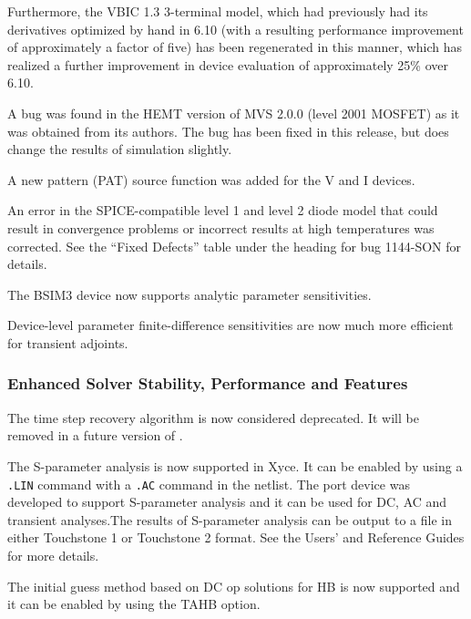 \documentclass[letterpaper]{scrartcl}
\begin{document}
\begin{XyceItemize}
  Furthermore, the VBIC 1.3 3-terminal model, which had previously had
  its derivatives optimized by hand in \Xyce{} 6.10 (with a resulting
  performance improvement of approximately a factor of five) has been
  regenerated in this manner, which has realized a further improvement
  in device evaluation of approximately 25\% over \Xyce{} 6.10.
\item A bug was found in the HEMT version of MVS 2.0.0 (level 2001
  MOSFET) as it was obtained from its authors.  The bug has been fixed
  in this release, but does change the results of simulation slightly.
\item A new pattern (PAT) source function was added for the V
  and I devices.
\item An error in the SPICE-compatible level 1 and level 2 diode model
  that could result in convergence problems or incorrect results at
  high temperatures was corrected.  See the ``Fixed Defects'' table
  under the heading for bug 1144-SON for details.
\item The BSIM3 device now supports analytic parameter sensitivities.
\item Device-level parameter finite-difference sensitivities are now much more efficient for transient adjoints.
\end{XyceItemize}

\subsubsection*{Enhanced Solver Stability, Performance and Features}
\begin{XyceItemize}
\item The time step recovery algorithm is now considered deprecated.  It will be removed in a future version of \Xyce{}.

\item The S-parameter analysis is now supported in Xyce. It can be enabled by using a \verb|.LIN| command with a \verb|.AC| command in the netlist. The port device was developed to support S-parameter analysis and it can be used for DC, AC and transient analyses.The results of S-parameter analysis can be output to a file in either Touchstone 1 or Touchstone 2 format. See the \Xyce{} Users' and Reference Guides
for more details.

\item The initial guess method based on DC op solutions for HB is now supported and it can be enabled by using the TAHB option.

\end{XyceItemize}
\end{document}
